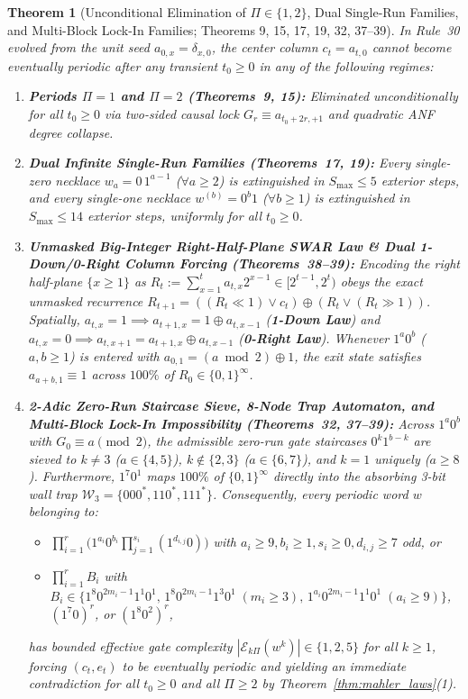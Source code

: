 \documentclass[11pt,a4paper]{article}
\newtheorem{theorem}{Theorem}[section]
\theoremstyle{definition}
\theoremstyle{remark}
\begin{document}
\begin{theorem}[Unconditional Elimination of $\Pi \in \{1,2\}$, Dual Single-Run Families, and Multi-Block Lock-In Families; Theorems 9, 15, 17, 19, 32, 37--39]\label{thm:infinite_families}
In Rule~30 evolved from the unit seed $a_{0,x} = \delta_{x,0}$, the center column $c_t = a_{t,0}$ cannot become eventually periodic after any transient $t_0 \ge 0$ in any of the following regimes:
\begin{enumerate}
  \item \textbf{Periods $\Pi = 1$ and $\Pi = 2$ (Theorems~9, 15):} Eliminated unconditionally for all $t_0 \ge 0$ via two-sided causal lock $G_r \equiv a_{t_0+2r,+1}$ and quadratic ANF degree collapse.
  \item \textbf{Dual Infinite Single-Run Families (Theorems~17, 19):} Every single-zero necklace $w_a = 0\,1^{a-1}$ ($\forall a \ge 2$) is extinguished in $S_{\max} \le 5$ exterior steps, and every single-one necklace $w^{(b)} = 0^b 1$ ($\forall b \ge 1$) is extinguished in $S_{\max} \le 14$ exterior steps, uniformly for all $t_0 \ge 0$.
  \item \textbf{Unmasked Big-Integer Right-Half-Plane SWAR Law \& Dual 1-Down/0-Right Column Forcing (Theorems~38--39):} Encoding the right half-plane $\{x \ge 1\}$ as $R_t := \sum_{x=1}^t a_{t,x} 2^{x-1} \in [2^{t-1}, 2^t)$ obeys the exact unmasked recurrence $R_{t+1} = ((R_t \ll 1) \lor c_t) \oplus (R_t \lor (R_t \gg 1))$. Spatially, $a_{t,x} = 1 \implies a_{t+1,x} = 1 \oplus a_{t,x-1}$ (\textbf{1-Down Law}) and $a_{t,x} = 0 \implies a_{t,x+1} = a_{t+1,x} \oplus a_{t,x-1}$ (\textbf{0-Right Law}). Whenever $1^a 0^b$ ($a,b \ge 1$) is entered with $a_{0,1} = (a \bmod 2) \oplus 1$, the exit state satisfies $a_{a+b,1} \equiv 1$ across $100\%$ of $R_0 \in \{0,1\}^\infty$.
  \item \textbf{2-Adic Zero-Run Staircase Sieve, 8-Node Trap Automaton, and Multi-Block Lock-In Impossibility (Theorems~32, 37--39):} Across $1^a 0^b$ with $G_0 \equiv a \pmod 2$, the admissible zero-run gate staircases $0^k 1^{b-k}$ are sieved to $k \ne 3$ ($a \in \{4,5\}$), $k \notin \{2,3\}$ ($a \in \{6,7\}$), and $k = 1$ uniquely ($a \ge 8$). Furthermore, $1^7 0^1$ maps $100\%$ of $\{0,1\}^\infty$ directly into the absorbing 3-bit wall trap $\mathcal{W}_3 = \{000^*, 110^*, 111^*\}$. Consequently, every periodic word $w$ belonging to:
  \begin{itemize}
    \item $\prod_{i=1}^r \bigl(1^{a_i} 0^{b_i} \prod_{j=1}^{s_i} (1^{d_{i,j}} 0)\bigr)$ with $a_i \ge 9, b_i \ge 1, s_i \ge 0, d_{i,j} \ge 7$ odd, or
    \item $\prod_{i=1}^r B_i$ with $B_i \in \{1^8 0^{2m_i-1} 1^1 0^1,\, 1^8 0^{2m_i-1} 1^3 0^1\;(m_i\ge 3),\, 1^{a_i} 0^{2m_i-1} 1^1 0^1\;(a_i \ge 9)\}$, $(1^7 0)^r$, or $(1^8 0^2)^r$,
  \end{itemize}
  has bounded effective gate complexity $|\mathcal{E}_{k\Pi}(w^k)| \in \{1, 2, 5\}$ for all $k \ge 1$, forcing $(c_t, e_t)$ to be eventually periodic and yielding an immediate contradiction for all $t_0 \ge 0$ and all $\Pi \ge 2$ by Theorem~\ref{thm:mahler_laws}(1).
\end{enumerate}
\end{theorem}
\end{document}
